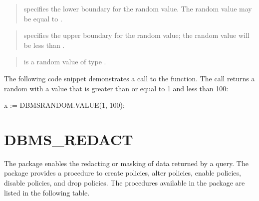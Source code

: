 \documentclass[letterpaper,10pt,english,openany,oneside]{sphinxmanual}
\begin{document}

\begin{quote}

 specifies the lower boundary for the random value. The random
value may be equal to .
\end{quote}

\begin{quote}

 specifies the upper boundary for the random value; the random
value will be less than .
\end{quote}

\begin{quote}

 is a random value of type .
\end{quote}


The following code snippet demonstrates a call to the  function.
The call returns a random  with a value that is greater than or
equal to 1 and less than 100:

%
\begin{sphinxVerbatim}[commandchars=\\\{\}]
x := DBMS\PYGZus{}RANDOM.VALUE(1, 100);
\end{sphinxVerbatim}

\newpage


\section{DBMS\_REDACT}
\label{\detokenize{dbms_redact::doc}}\label{\detokenize{dbms_redact:dbms-redact}}
The  package enables the redacting or masking of data
returned by a query. The  package provides a procedure to
create policies, alter policies, enable policies, disable policies, and
drop policies. The procedures available in the  package are
listed in the following table.
\end{document}

